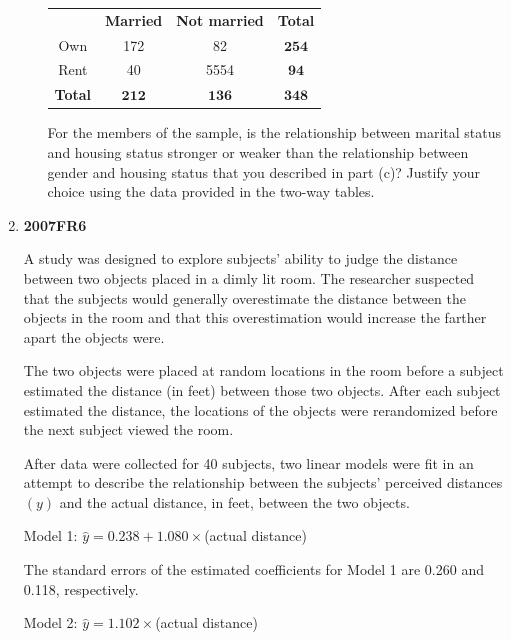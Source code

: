 \documentclass[a4paper,12pt,twoside]{book}
\begin{document}
\begin{enumerate}
\begin{enumerate}
            \begin{table}[H]
            \centering
            \begin{tabular}{cccc}
            \hline
            &\textbf{Married}&\textbf{Not married}&\textbf{Total}\\
            Own&172&82&$\mathbf{254}$\\
            Rent&40&5554&$\mathbf{94}$\\
            \textbf{Total}&$\mathbf{212}$&$\mathbf{136}$&$\mathbf{348}$\\
            \hline          
            \end{tabular}
        \end{table}
          For the members of the sample, is the relationship between marital status and housing status stronger or weaker than the relationship between gender and housing status that you described in part (c)? Justify your choice using the data provided in the two-way tables. 
      \end{enumerate}  
      \newpage    
  
  \item \textbf{2007FR6}

A study was designed to explore subjects’ ability to judge the distance between two objects placed in a dimly lit room. The researcher suspected that the subjects would generally overestimate the distance between the objects in the room and that this overestimation would increase the farther apart the objects were.

The two objects were placed at random locations in the room before a subject estimated the distance (in feet) between those two objects. After each subject estimated the distance, the locations of the objects were rerandomized before the next subject viewed the room.

After data were collected for 40 subjects, two linear models were fit in an attempt to describe the relationship between the subjects’ perceived distances $(y)$ and the actual distance, in feet, between the two objects.

\begin{center}
{Model 1: $\hat{y} =0.238+1.080 \times$(actual distance)}
\end{center}

The standard errors of the estimated coefficients for Model 1 are 0.260 and 0.118, respectively.

\begin{center}
Model 2: $\hat{y}=1.102\times$(actual distance)
\end{center}


\end{enumerate}
\end{document}
